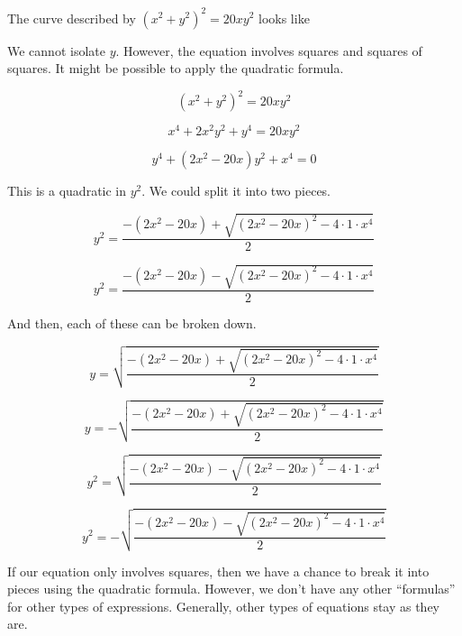 \documentclass{ximera}
\begin{document}
\begin{example}


The curve described by $(x^2 + y^2)^2 = 20 x y^2$ looks like



\begin{center}
\end{center}


We cannot isolate $y$.  However, the equation involves squares and squares of squares.  It might be possible to apply the quadratic formula.


\[ (x^2 + y^2)^2 = 20 x y^2  \]

\[ x^4 + 2 x^2 y^2 + y^4 = 20 x y^2  \]

\[ y^4 + (2 x^2 - 20 x) y^2 + x^4 = 0 \]




This is a quadratic in $y^2$.  We could split it into two pieces.  



\[ y^2 = \frac{-(2 x^2 - 20 x) + \sqrt{(2x^2-20x)^2 - 4 \cdot 1 \cdot x^4}}{2}   \]


\[ y^2 = \frac{-(2 x^2 - 20 x) - \sqrt{(2x^2-20x)^2 - 4 \cdot 1 \cdot x^4}}{2}   \]



And then, each of these can be broken down.




\[ y = \sqrt{\frac{-(2 x^2 - 20 x) + \sqrt{(2x^2-20x)^2 - 4 \cdot 1 \cdot x^4}}{2}}   \]


\[ y = -\sqrt{\frac{-(2 x^2 - 20 x) + \sqrt{(2x^2-20x)^2 - 4 \cdot 1 \cdot x^4}}{2}}   \]



\[ y^2 = \sqrt{\frac{-(2 x^2 - 20 x) - \sqrt{(2x^2-20x)^2 - 4 \cdot 1 \cdot x^4}}{2}}   \]


\[ y^2 = -\sqrt{\frac{-(2 x^2 - 20 x) - \sqrt{(2x^2-20x)^2 - 4 \cdot 1 \cdot x^4}}{2}}   \]





\begin{center}
\end{center}


If our equation only involves squares, then we have a chance to break it into pieces using the quadratic formula.  However, we don't have any other ``formulas'' for other types of expressions.  Generally, other types of equations stay as they are.


\end{example}
\end{document}
